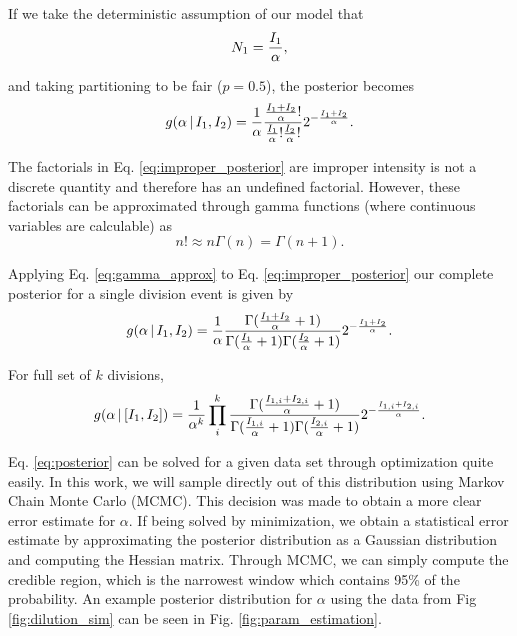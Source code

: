 If we take the deterministic assumption of our model that
\begin{equation}
N_1 = {I_1 \over \alpha},
\end{equation}

and taking partitioning to be fair ($p = 0.5$), the posterior becomes
\begin{equation}
g(\alpha\,\vert\,I_1, I_2) = {1 \over \alpha}{{I_1 + I_2 \over \alpha}! \over {I_1 \over \alpha}! {I_2 \over \alpha}!}2^{-{I_1 + I_2 \over \alpha}}.
\label{eq:improper_posterior}
\end{equation}

The factorials in Eq. \ref{eq:improper_posterior} are improper intensity is not
a discrete quantity and therefore has an undefined factorial. However, these
factorials can be approximated through gamma functions (where continuous variables
are calculable) as
\begin{equation}
n! \approx n\Gamma(n) = \Gamma(n + 1).
\label{eq:gamma_approx}
\end{equation}

Applying Eq. \ref{eq:gamma_approx} to Eq. \ref{eq:improper_posterior} our
complete posterior for a single division event is given by
\begin{equation}
  g(\alpha\,\vert\, I_1, I_2)= {1 \over \alpha}{\Gamma({I_1 + I_2 \over \alpha} + 1) \over \Gamma({I_1 \over \alpha} +1 )\Gamma({I_2 \over \alpha} + 1)}2^{-{I_1 + I_2 \over \alpha}}.
\end{equation}

For full set of $k$ divisions,
\begin{equation}
  g(\alpha\, \vert\, [I_1, I_2]) ={1 \over \alpha^k}\prod\limits_i^k {\Gamma({I_{1,i} + I_{2,i} \over \alpha} + 1) \over \Gamma({I_{1,i} \over \alpha} + 1) \Gamma({I_{2,i} \over \alpha} + 1)}2^{-{I_{1,i} + I_{2,i} \over \alpha }}.
\label{eq:posterior}
\end{equation}

Eq. \ref{eq:posterior} can be solved for a given data set through optimization
quite easily. In this work, we will sample directly out of this distribution
using Markov Chain Monte Carlo (MCMC). This decision was made to obtain a more
clear error estimate for $\alpha$. If being solved by minimization, we obtain
a statistical error estimate by approximating the posterior distribution as a
Gaussian distribution and computing the Hessian matrix. Through MCMC, we can
simply compute the credible region, which is the narrowest window which contains
95\% of the probability. An example posterior distribution for $\alpha$ using
the data from Fig \ref{fig:dilution_sim} can be seen in Fig. \ref{fig:param_estimation}.

